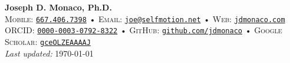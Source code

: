 \begin{center}
  \textbf{\LARGE\color{hopkinsblue} Joseph D. Monaco, Ph.D.} \\[0.1in]
  \small
  \textsc{Mobile:} \href{tel:16674067398}{\color{hopkinsblue}\texttt{667.406.7398}} •
  \textsc{Email:} \href{mailto:joe@selfmotion.net}{\color{hopkinsblue}\texttt{joe@selfmotion.net}} • 
  \textsc{Web:} \href{https://jdmonaco.com/}{\color{hopkinsblue}\texttt{jdmonaco.com}} \\  
  \textsc{ORCID:} \href{https://jdmonaco.com/orcid}{\color{hopkinsblue}\texttt{0000-0003-0792-8322}} • 
  \textsc{GitHub:} \href{https://jdmonaco.com/github}{\color{hopkinsblue}\texttt{github.com/jdmonaco}} • 
  \textsc{Google Scholar:} \href{https://jdmonaco.com/google-scholar}{\color{hopkinsblue}\texttt{gceOLZEAAAAJ}} \\
  {\tiny \emph{Last updated:} \today}
\end{center}



